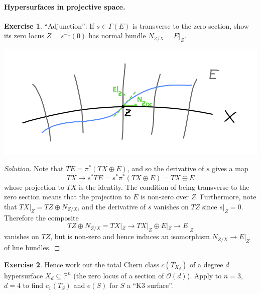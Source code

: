 \documentclass{article}
\theoremstyle{definition}
\newtheorem*{exercise}{Exercise}
\renewcommand{\O}{\mathcal{O}}
\renewcommand{\P}{\mathbb{P}}
\begin{document}
\paragraph{Hypersurfaces in projective space.}
\begin{exercise}
    ``Adjunction'': If $s\in\Gamma(E)$ is transverse to the zero section, show
    its zero locus $Z=s^{-1}(0)$ has normal bundle $N_{Z/X}=E|_Z.$
    \begin{center}
        \includegraphics[scale=0.5]{chern_normal}
    \end{center}
\end{exercise}

\begin{proof}[Solution]
    Note that $TE=\pi^*(TX\oplus E)$, and so the derivative of $s$ gives a map
    \begin{equation*}
        TX\to s^*TE = s^*\pi^*(TX\oplus E) = TX\oplus E
    \end{equation*}
    whose projection to $TX$ is the identity. The condition of being transverse
    to the zero section means that the projection to $E$ is non-zero over $Z$.
    Furthermore, note that $TX|_Z=TZ\oplus N_{Z/X}$, and the derivative of $s$
    vanishes on $TZ$ since $s|_Z=0$. Therefore the composite
    \begin{equation*}
        TZ\oplus N_{Z/X} = TX|_Z \to TX|_Z\oplus E|_Z \to E|_Z
    \end{equation*}
    vanishes on $TZ$, but is non-zero and hence induces an isomorphism
    $N_{Z/X}\to E|_Z$ of line bundles.
\end{proof}

\begin{exercise}
    Hence work out the total Chern class $c(T_{X_d})$ of a degree $d$
    hypersurface $X_d\subseteq\P^n$ (the zero locus of a section of $\O(d)$).
    Apply to $n=3$, $d=4$ to find $c_1(T_S)$ and $e(S)$ for $S$ a ``K3
    surface''.
\end{exercise}
\end{document}
